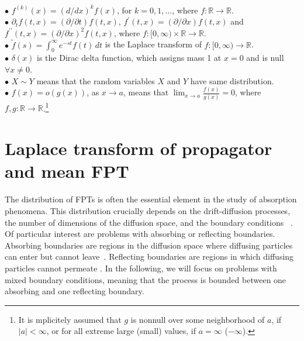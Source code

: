 \documentclass[preprint,12pt]{elsarticle}
\numberwithin{equation}{section}
\theoremstyle{plain} \newtheorem{theorem}{Theorem}[section]
\theoremstyle{plain} \newtheorem{proposition}[theorem]{Proposition}
\theoremstyle{plain} \newtheorem{lemma}[theorem]{Lemma}
\theoremstyle{plain} \newtheorem{corollary}[theorem]{Corollary}
\theoremstyle{definition} \newtheorem{definition}[theorem]{Definition}
\theoremstyle{definition} \newtheorem{notation}[theorem]{Notation}
\theoremstyle{remark} \newtheorem{remark}[theorem]{Remark}
\theoremstyle{remark} \newtheorem{remarks}[theorem]{Remarks}
\theoremstyle{remark} \newtheorem{algorithm2}[theorem]{Algorithm}
\theoremstyle{remark} \newtheorem{example}[theorem]{Example}
\newcommand{\R}{\mathbb{R}}
\begin{document}
 \\
\noindent
$\bullet$ $f^{(k)}(x)= (d/dx)^k f(x)$, for $k=0,1,\ldots$, where $f: \R \to \R$. \\
\noindent
$\bullet$ $\partial_t{f} (t,x) = (\partial / \partial t)
f(t,x)$,
$f^\prime (t,x)= (\partial / \partial x)
f(t,x)$ and $f^{\prime\prime} (t,x) = (\partial / \partial x)^2
f(t,x)$,
where 
$f: [0,\infty) \times \R \to \R$.
\\
\noindent $\bullet$
    $\tilde{f}(s)
	=\int_0^\infty e^{-st} f(t)\,dt$
 is the Laplace transform of $f:[0,\infty) \to \R$.
 \\
 \noindent $\bullet$ $\delta(x)$ is the Dirac delta function, which assigns mass 1 at $x=0$ and is null $\forall x \neq 0$. \\
\noindent
$\bullet$ $X \sim Y$ means that the random variables $X$
 and $Y$ have same distribution. \\
 \noindent $\bullet$ $f(x)=o\left(g(x)\right)$, as $x\to a$, means that $\lim_{x\to a} \frac{f(x)}{g(x)}=0$, where $f,g: \R \to \R$.\footnote{It is mplicitely assumed that
 $g$ is nonnull over some neighborhood of $a$, if $|a| < \infty$, or for all extreme large (small) values, if $a=\infty$ ($-\infty$).}

\section{Laplace transform of propagator and mean FPT}                 \label{s2}
The distribution of FPTs is often the essential 
element in the study of absorption phenomena. This distribution crucially depends on the drift-diffusion processes, the number of dimensions of the diffusion space, and the boundary conditions~ \cite{redner2001guide, yustelindenberg, dyesguerra, voiturezbenichou}. Of particular interest are problems with absorbing or reflecting boundaries. Absorbing boundaries are regions in the diffusion space where diffusing particles can enter but cannot leave~\cite{cox65theory}. Reflecting boundaries are regions in which diffusing particles cannot permeate \cite{Skorokhod1961}. In the following, we will focus on problems with mixed boundary conditions, meaning that the process is bounded between one absorbing and one reflecting boundary.
\end{document}
